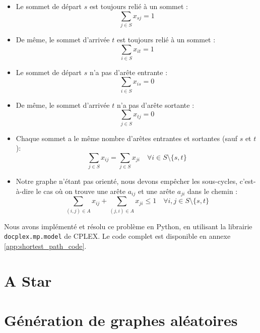 \begin{itemize}
    \item Le sommet de départ $s$ est toujours relié à un sommet :
    \begin{equation}
        \sum_{j \in S} x_{sj} = 1
    \end{equation}
    \item De même, le sommet d'arrivée $t$ est toujours relié à un sommet :
    \begin{equation}
        \sum_{i \in S} x_{it} = 1
    \end{equation}
    \item Le sommet de départ $s$ n'a pas d'arête entrante :
    \begin{equation}
        \sum_{i \in S} x_{is} = 0
    \end{equation}
    \item De même, le sommet d'arrivée $t$ n'a pas d'arête sortante :
    \begin{equation}
        \sum_{j \in S} x_{tj} = 0
    \end{equation}
    \item Chaque sommet a le même nombre d'arêtes entrantes et sortantes (sauf $s$ et $t$):
    \begin{equation}
        \sum_{j \in S} x_{ij} = \sum_{j \in S} x_{ji} \quad \forall i \in S \setminus \{s,t\}
    \end{equation}
    \item Notre graphe n'étant pas orienté, nous devons empêcher les sous-cycles, c'est-à-dire le cas où on trouve une arête $a_{ij}$ et une arête $a_{ji}$ dans le chemin :
    \begin{equation}
        \sum_{(i,j) \in A} x_{ij} + \sum_{(j,i) \in A} x_{ji} \leq 1 \quad \forall i,j \in S \setminus \{s,t\}
    \end{equation}
\end{itemize}

Nous avons implémenté et résolu ce problème en Python, en utilisant la librairie \texttt{docplex.mp.model} de CPLEX. Le code complet est disponible en annexe \ref{app:shortest_path_code}.

\section{A Star}
\label{sec:shortest_path_astar}

\section{Génération de graphes aléatoires}
\label{sec:shortest_path_random_graph}

